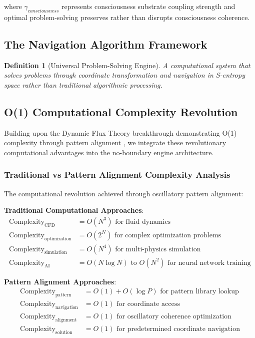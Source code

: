 \documentclass[11pt,a4paper]{article}
\newtheorem{definition}[theorem]{Definition}
\theoremstyle{remark}
\begin{document}
where $\gamma_{consciousness}$ represents consciousness substrate coupling strength and optimal problem-solving preserves rather than disrupts consciousness coherence.

\subsection{The Navigation Algorithm Framework}

\begin{definition}[Universal Problem-Solving Engine]
A computational system that solves problems through coordinate transformation and navigation in S-entropy space rather than traditional algorithmic processing.
\end{definition}

\subsection{O(1) Computational Complexity Revolution}

Building upon the Dynamic Flux Theory breakthrough demonstrating O(1) complexity through pattern alignment \cite{sachikonye2024flux}, we integrate these revolutionary computational advantages into the no-boundary engine architecture.

\subsubsection{Traditional vs Pattern Alignment Complexity Analysis}

The computational revolution achieved through oscillatory pattern alignment:

\textbf{Traditional Computational Approaches}:
\begin{align}
\text{Complexity}_{\text{CFD}} &= O(N^3) \text{ for fluid dynamics} \\
\text{Complexity}_{\text{optimization}} &= O(2^N) \text{ for complex optimization problems} \\
\text{Complexity}_{\text{simulation}} &= O(N^4) \text{ for multi-physics simulation} \\
\text{Complexity}_{\text{AI}} &= O(N \log N) \text{ to } O(N^2) \text{ for neural network training}
\end{align}

\textbf{Pattern Alignment Approaches}:
\begin{align}
\text{Complexity}_{\text{pattern}} &= O(1) + O(\log P) \text{ for pattern library lookup} \\
\text{Complexity}_{\text{navigation}} &= O(1) \text{ for coordinate access} \\
\text{Complexity}_{\text{alignment}} &= O(1) \text{ for oscillatory coherence optimization} \\
\text{Complexity}_{\text{solution}} &= O(1) \text{ for predetermined coordinate navigation}
\end{align}
\end{document}
